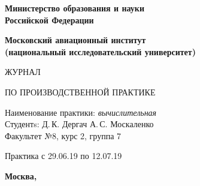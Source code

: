 \documentclass[dvipsnames,pdf, unicode, 12pt, a4paper, oneside, fleqn]{article}
\begin{document}
	
	\begin{titlepage}
		\begin{center}
			\bfseries{\Large Министерство образования и науки\\Российской Федерации}
			
			\vspace{12pt}
			
			\bfseries{\Large Московский авиационный институт\\ (национальный исследовательский университет)}
			
			\vspace{48pt}
			
			
			
			\vspace{36pt}
			
			
			
			\vspace{48pt}
			
			{\huge ЖУРНАЛ}
			
			\vspace{12pt}
			
			{\large ПО ПРОИЗВОДСТВЕННОЙ ПРАКТИКЕ}
			
			
		\end{center}
		
		\vspace{72pt}
		
		\begin{flushleft}
			Наименование практики: {\itshape вычислительная}\\
			Студентs: Д.\,К. Дергач А.\,С. Москаленко \\
			Факультет №8, курс 2, группа 7 \\
		\end{flushleft}
		
		\vspace{12pt}
		
		\begin{flushleft}
			Практика с 29.06.19 по 12.07.19
		\end{flushleft}
		
		\vfill
		
		\begin{center}
			\bfseries Москва, \the\year
		\end{center}
	\end{titlepage}
	
	\pagebreak
	
\end{document}
